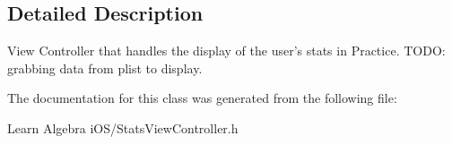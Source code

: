 \subsection{Detailed Description}
View Controller that handles the display of the user's stats in Practice. T\-O\-D\-O\-: grabbing data from plist to display. 

The documentation for this class was generated from the following file\-:\begin{DoxyCompactItemize}
\item 
Learn Algebra i\-O\-S/Stats\-View\-Controller.\-h\end{DoxyCompactItemize}
